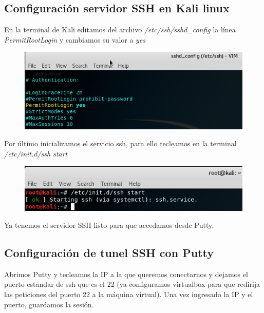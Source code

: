 \documentclass{article}
\begin{document}
\subsection{Configuraci\'on servidor SSH en Kali linux}

En la terminal de Kali editamos del archivo \emph{/etc/ssh/sshd\_config} la l\'inea \emph{PermitRootLogin} y cambiamos su valor a \emph{yes}

\begin{figure}[H]
\centering
\includegraphics[width=1\textwidth]{06-CONFIGURACIONSSHD}
\end{figure}

Por \'ultimo inicializamos el servicio ssh, para ello tecleamos en la terminal \emph{/etc/init.d/ssh start}

\begin{figure}[H]
\centering
\includegraphics[width=1\textwidth]{07-STARTSSHD}
\end{figure}

Ya tenemos el servidor SSH listo para que accedamos desde Putty.

\subsection{Configuraci\'on de tunel SSH con Putty}

Abrimos Putty y tecleamos la IP a la que queremos conectarnos y dejamos el puerto estandar de ssh que es el 22 (ya configuramos virtualbox para que redirija las peticiones del puerto 22 a la m\'aquina virtual). Una vez ingresado la IP y el puerto, guardamos la sesi\'on.
\end{document}
